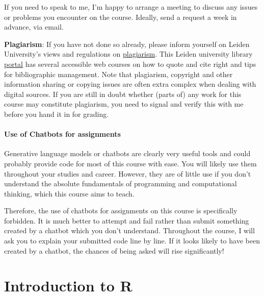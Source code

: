 \documentclass[
  letterpaper,
  DIV=11,
  numbers=noendperiod]{scrreprt}
\begin{document}
If you need to speak to me, I'm happy to arrange a meeting to discuss
any issues or problems you encounter on the course. Ideally, send a
request a week in advance, via email.

\textbf{Plagiarism}: If you have not done so already, please inform
yourself on Leiden University's views and regulations on
\href{https://www.organisatiegids.universiteitleiden.nl/binaries/content/assets/ul2student/reglementen/gedragscode-plagiaat-universiteit-leiden-eng--cvb.docx}{plagiarism}.
This Leiden university library
\href{https://www.library.universiteitleiden.nl/students/citing}{portal}
has several accessible web courses on how to quote and cite right and
tips for bibliographic management. Note that plagiarism, copyright and
other information sharing or copying issues are often extra complex when
dealing with digital sources. If you are still in doubt whether (parts
of) any work for this course may constitute plagiarism, you need to
signal and verify this with me before you hand it in for grading.

\subsection*{Use of Chatbots for
assignments}\label{use-of-chatbots-for-assignments}

Generative language models or chatbots are clearly very useful tools and
could probably provide code for most of this course with ease. You will
likely use them throughout your studies and career. However, they are of
little use if you don't understand the absolute fundamentals of
programming and computational thinking, which this course aims to teach.

Therefore, the use of chatbots for assignments on this course is
specifically forbidden. It is much better to attempt and fail rather
than submit something created by a chatbot which you don't understand.
Throughout the course, I will ask you to explain your submitted code
line by line. If it looks likely to have been created by a chatbot, the
chances of being asked will rise significantly!

\section*{}\label{section}

\markright{}

\part{Introduction to R}
\end{document}
